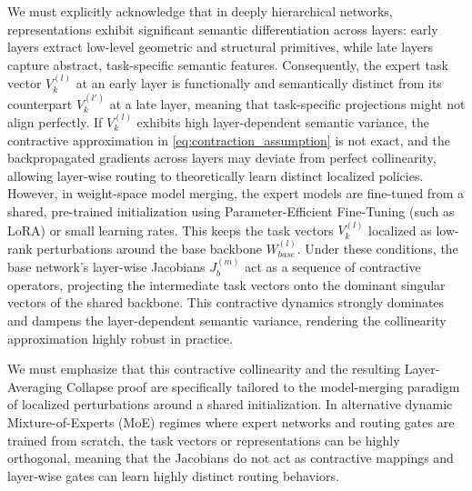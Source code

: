 We must explicitly acknowledge that in deeply hierarchical networks, representations exhibit significant semantic differentiation across layers: early layers extract low-level geometric and structural primitives, while late layers capture abstract, task-specific semantic features. Consequently, the expert task vector $V_k^{(l)}$ at an early layer is functionally and semantically distinct from its counterpart $V_k^{(l')}$ at a late layer, meaning that task-specific projections might not align perfectly. If $V_k^{(l)}$ exhibits high layer-dependent semantic variance, the contractive approximation in \cref{eq:contraction_assumption} is not exact, and the backpropagated gradients across layers may deviate from perfect collinearity, allowing layer-wise routing to theoretically learn distinct localized policies.
However, in weight-space model merging, the expert models are fine-tuned from a shared, pre-trained initialization using Parameter-Efficient Fine-Tuning (such as LoRA) or small learning rates. This keeps the task vectors $V_k^{(l)}$ localized as low-rank perturbations around the base backbone $W_{base}^{(l)}$. Under these conditions, the base network's layer-wise Jacobians $J_b^{(m)}$ act as a sequence of contractive operators, projecting the intermediate task vectors onto the dominant singular vectors of the shared backbone. This contractive dynamics strongly dominates and dampens the layer-dependent semantic variance, rendering the collinearity approximation highly robust in practice.

We must emphasize that this contractive collinearity and the resulting Layer-Averaging Collapse proof are specifically tailored to the model-merging paradigm of localized perturbations around a shared initialization. In alternative dynamic Mixture-of-Experts (MoE) regimes where expert networks and routing gates are trained from scratch, the task vectors or representations can be highly orthogonal, meaning that the Jacobians do not act as contractive mappings and layer-wise gates can learn highly distinct routing behaviors.


